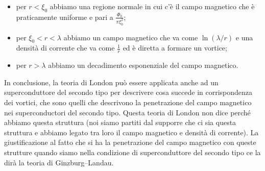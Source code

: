 \begin{itemize}[leftmargin=0.5cm]
   \item per $r<\xi_0$ abbiamo una regione normale in cui c'è il campo magnetico che è praticamente uniforme e pari a $\frac{\Phi_0}{\pi \xi_0^2}$;
   \item per $\xi_0 < r < \lambda$ abbiamo un campo magnetico che va come $\ln(\lambda/r)$ e una densità di corrente che va come $\frac{1}{r}$ ed è diretta a formare un vortice;
   \item per $r>\lambda$ abbiamo un decadimento esponenziale del campo magnetico.
\end{itemize}
In conclusione, la teoria di London può essere applicata anche ad un superconduttore del secondo tipo per descrivere cosa succede in corrispondenza dei vortici, che sono quelli che descrivono la penetrazione del campo magnetico nei superconductori del secondo tipo. Questa teoria di London non dice perché abbiamo questa struttura (noi siamo partiti dal supporre che ci sia questa struttura e abbiamo legato tra loro il campo magnetico e densità di corrente). La giustificazione al fatto che si ha la penetrazione del campo magnetico con queste strutture quando siamo nella condizione di superconduttore del secondo tipo ce la dirà la teoria di Ginzburg--Landau.

